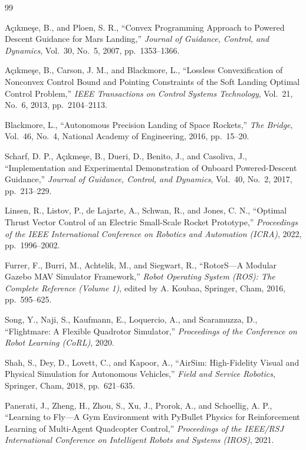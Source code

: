 \documentclass[10pt,letterpaper]{article}
\begin{document}
\setlength{\bibsep}{1pt}
\begin{thebibliography}{99}

A\c{c}{\i}kme\c{s}e, B., and Ploen, S. R., ``Convex Programming Approach to Powered Descent Guidance for Mars Landing,'' \textit{Journal of Guidance, Control, and Dynamics}, Vol.~30, No.~5, 2007, pp.~1353--1366.

A\c{c}{\i}kme\c{s}e, B., Carson, J. M., and Blackmore, L., ``Lossless Convexification of Nonconvex Control Bound and Pointing Constraints of the Soft Landing Optimal Control Problem,'' \textit{IEEE Transactions on Control Systems Technology}, Vol.~21, No.~6, 2013, pp.~2104--2113.

Blackmore, L., ``Autonomous Precision Landing of Space Rockets,'' \textit{The Bridge}, Vol.~46, No.~4, National Academy of Engineering, 2016, pp.~15--20.

Scharf, D. P., A\c{c}{\i}kme\c{s}e, B., Dueri, D., Benito, J., and Casoliva, J., ``Implementation and Experimental Demonstration of Onboard Powered-Descent Guidance,'' \textit{Journal of Guidance, Control, and Dynamics}, Vol.~40, No.~2, 2017, pp.~213--229.

Linsen, R., Listov, P., de Lajarte, A., Schwan, R., and Jones, C. N., ``Optimal Thrust Vector Control of an Electric Small-Scale Rocket Prototype,'' \textit{Proceedings of the IEEE International Conference on Robotics and Automation (ICRA)}, 2022, pp.~1996--2002.

Furrer, F., Burri, M., Achtelik, M., and Siegwart, R., ``RotorS---A Modular Gazebo MAV Simulator Framework,'' \textit{Robot Operating System (ROS): The Complete Reference (Volume 1)}, edited by A. Koubaa, Springer, Cham, 2016, pp.~595--625.

Song, Y., Naji, S., Kaufmann, E., Loquercio, A., and Scaramuzza, D., ``Flightmare: A Flexible Quadrotor Simulator,'' \textit{Proceedings of the Conference on Robot Learning (CoRL)}, 2020.

Shah, S., Dey, D., Lovett, C., and Kapoor, A., ``AirSim: High-Fidelity Visual and Physical Simulation for Autonomous Vehicles,'' \textit{Field and Service Robotics}, Springer, Cham, 2018, pp.~621--635.

Panerati, J., Zheng, H., Zhou, S., Xu, J., Prorok, A., and Schoellig, A. P., ``Learning to Fly---A Gym Environment with PyBullet Physics for Reinforcement Learning of Multi-Agent Quadcopter Control,'' \textit{Proceedings of the IEEE/RSJ International Conference on Intelligent Robots and Systems (IROS)}, 2021.


\end{thebibliography}
\end{document}
